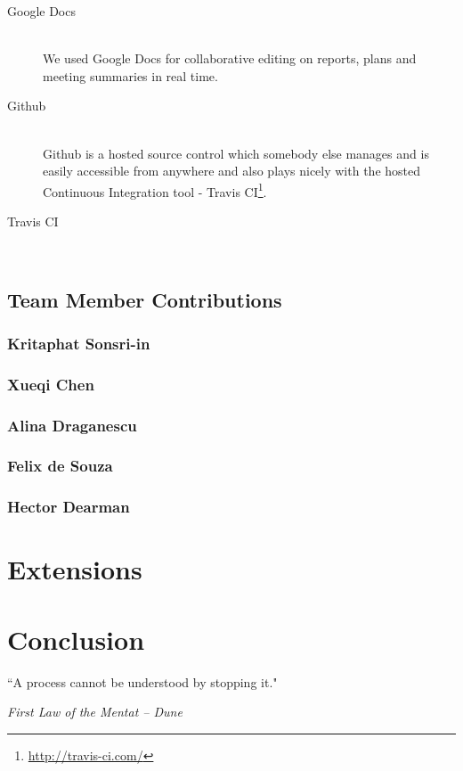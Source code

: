 \documentclass[11pt, a4paper]{article}
\newlength\longest
\begin{document}
\begin{description}
\item[Google Docs] \hfill \\
We used Google Docs for collaborative editing on reports, plans and meeting summaries in real time.
  
\item[Github] \hfill \\
Github is a hosted source control which somebody else manages and is easily accessible from anywhere and also plays nicely with the hosted Continuous Integration tool - Travis CI\footnote{\url{http://travis-ci.com/}}.

\item[Travis CI] \hfill \\
\end{description}

\subsection{Team Member Contributions}
\subsubsection{Kritaphat Sonsri-in}
\subsubsection{Xueqi Chen}
\subsubsection{Alina Draganescu}
\subsubsection{Felix de Souza}
\subsubsection{Hector Dearman}

\section{Extensions}
\section{Conclusion}

\clearpage
\thispagestyle{empty}
\null\vfill
\begin{center}
\settowidth{}
\parbox{\longest}{%
  \raggedright{%
  ``A process cannot be understood by stopping it." \\
  }   
  \raggedright{\emph{First Law of the Mentat -- Dune}}\par%
}
\end{center}
\vfill\vfill
\clearpage
\end{document}
